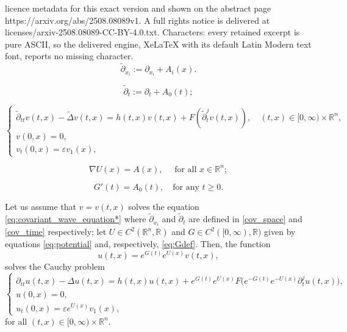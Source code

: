 \documentclass[10pt,a4paper]{amsart}
\newcommand{\R}{\mathbb{R}}
\begin{document}
licence metadata for this exact version and shown on the abstract page https://arxiv.org/abs/2508.08089v1. A full rights notice is delivered at licenses/arxiv-2508.08089-CC-BY-4.0.txt. Characters: every retained excerpt is pure ASCII, so the delivered engine, XeLaTeX with its default Latin Modern text font, reports no missing character.
\begin{equation}\label{cov_space}
\tilde{\partial}_{x_i}:=\partial_{x_i}+A_i(x).
\end{equation}

\begin{equation}\label{cov_time}
\tilde{\partial}_t:=\partial_t+  A_0(t);
\end{equation}

\begin{equation}
\label{eq:covariant_wave_equation*}
\begin{cases}
\tilde\partial_{tt}v(t,x)- \tilde\Delta v(t,x)=h(t,x)v(t,x)+F(\tilde \partial_t^j v(t,x)), \quad (t,x)\in [0,\infty)\times \R^n, \\
v(0,x)=0,&\\
v_t(0,x)= \varepsilon v_1(x),&
\end{cases}
\end{equation}

\begin{equation}
\label{eq:potential}
    \nabla U(x)= A(x), \quad \text{ for all } x\in \R^n;
\end{equation}

\begin{equation}
\label{eq:Gdef}
G'(t)=A_0(t), \quad \text{for any } t\geq 0.
\end{equation}

\begin{lemma}
\label{lem:change_of_coordinates}
Let us assume that $v=v(t,x)$ solves the equation \eqref{eq:covariant_wave_equation*}
where  $\tilde\partial_{x_i}$ and $\tilde\partial_t$ are defined in \eqref{cov_space}  and \eqref{cov_time} respectively; let $U\in C^2(\R^n,\R)$ and $G\in C^2([0,\infty),\R)$ given by equations \eqref{eq:potential} and, respectively, \eqref{eq:Gdef}. Then, the function 
%
\begin{equation*}
u(t,x)=e^{G(t)} e^{U(x)} v(t,x),
\end{equation*}
solves the Cauchy problem
\begin{equation}
\begin{cases}
\label{eq:wave_equation*}
\partial_{tt}u(t,x)-\Delta u(t,x)= h(t,x)u(t,x)+e^{G(t)} e^{U(x)} F\Big(e^{-G(t)} e^{-U(x)}\partial_t^j u(t,x)\Big),&\\
u(0,x)=0,&\\
u_t(0,x)=\varepsilon e^{U(x)} v_1(x),&
\end{cases}
\end{equation}
%
for all $(t,x)\in [0,\infty)\times \R^n$.
\end{lemma}
\end{document}
